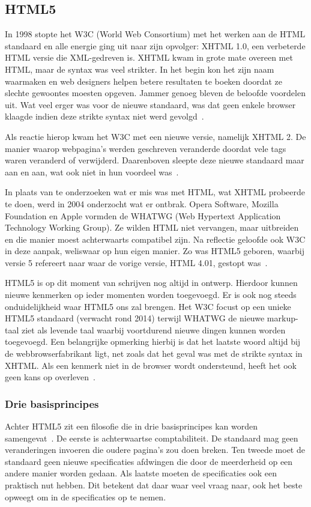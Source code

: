 \subsection{HTML5}
In 1998 stopte het W3C (World Web Consortium) met het werken aan de HTML standaard en alle energie ging uit naar zijn opvolger: XHTML 1.0, een verbeterde HTML versie die XML-gedreven is. XHTML kwam in grote mate overeen met HTML, maar de syntax was veel strikter. In het begin kon het zijn naam waarmaken en web designers helpen betere resultaten te boeken doordat ze slechte gewoontes moesten opgeven. Jammer genoeg bleven de beloofde voordelen uit. Wat veel erger was voor de nieuwe standaard, was dat geen enkele browser klaagde indien deze strikte syntax niet werd gevolgd~\cite{MacDonald2011}.

Als reactie hierop kwam het W3C met een nieuwe versie, namelijk XHTML 2. De manier waarop webpagina's werden geschreven veranderde doordat vele tags waren veranderd of verwijderd. Daarenboven sleepte deze nieuwe standaard maar aan en aan, wat ook niet in hun voordeel was~\cite{MacDonald2011}. 

In plaats van te onderzoeken wat er mis was met HTML, wat XHTML probeerde te doen, werd in 2004 onderzocht wat er ontbrak. Opera Software, Mozilla Foundation en Apple vormden de WHATWG (Web Hypertext Application Technology Working Group). Ze wilden HTML niet vervangen, maar uitbreiden en die manier moest achterwaarts compatibel zijn. Na reflectie geloofde ook W3C in deze aanpak, weliswaar op hun eigen manier.  Zo was HTML5 geboren, waarbij versie 5 refereert naar waar de vorige versie, HTML 4.01, gestopt was~\cite{MacDonald2011}.

HTML5 is op dit moment van schrijven nog altijd in ontwerp. Hierdoor kunnen nieuwe kenmerken op ieder momenten worden toegevoegd.  Er is ook nog steeds onduidelijkheid waar HTML5 ons zal brengen.  Het W3C focust op een unieke HTML5 standaard (verwacht rond 2014) terwijl WHATWG de nieuwe markup-taal ziet als levende taal waarbij voortdurend  nieuwe dingen kunnen worden toegevoegd. Een belangrijke opmerking hierbij is dat het laatste woord altijd bij de webbrowserfabrikant ligt, net zoals dat het geval was met de strikte syntax in XHTML. Als een kenmerk niet in de browser wordt ondersteund, heeft het ook geen kans op overleven~\cite{MacDonald2011}.

\subsubsection{Drie basisprincipes}
Achter HTML5 zit een filosofie die in drie basisprincipes kan worden samengevat~\cite{MacDonald2011}.  De eerste is achterwaartse comptabiliteit. De standaard mag geen veranderingen invoeren die oudere pagina's zou doen breken. Ten tweede moet de standaard geen nieuwe specificaties afdwingen die door de meerderheid op een andere manier worden gedaan. Als laatste moeten de specificaties ook een praktisch nut hebben. Dit betekent dat daar waar veel vraag naar, ook het beste opweegt om in de specificaties op te nemen.

